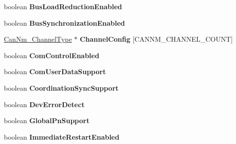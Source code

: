 \begin{DoxyCompactItemize}
\item 
boolean {\bfseries Bus\+Load\+Reduction\+Enabled}\hypertarget{structCanNm__ConfigType_aa6b95e5042692945b91580bbb8b4dfd3}{}\label{structCanNm__ConfigType_aa6b95e5042692945b91580bbb8b4dfd3}

\item 
boolean {\bfseries Bus\+Synchronization\+Enabled}\hypertarget{structCanNm__ConfigType_adad31250fae945f7b5fd5e4e1b13e11d}{}\label{structCanNm__ConfigType_adad31250fae945f7b5fd5e4e1b13e11d}

\item 
\hyperlink{structCanNm__ChannelType}{Can\+Nm\+\_\+\+Channel\+Type} $\ast$ {\bfseries Channel\+Config} \mbox{[}C\+A\+N\+N\+M\+\_\+\+C\+H\+A\+N\+N\+E\+L\+\_\+\+C\+O\+U\+NT\mbox{]}\hypertarget{structCanNm__ConfigType_a8c835a645a6e78766bca6702d6a55105}{}\label{structCanNm__ConfigType_a8c835a645a6e78766bca6702d6a55105}

\item 
boolean {\bfseries Com\+Control\+Enabled}\hypertarget{structCanNm__ConfigType_ae3126d62d493df7577c2ff4d01a140c8}{}\label{structCanNm__ConfigType_ae3126d62d493df7577c2ff4d01a140c8}

\item 
boolean {\bfseries Com\+User\+Data\+Support}\hypertarget{structCanNm__ConfigType_a8332e4e0309c89e65f8f5a45e7a9301c}{}\label{structCanNm__ConfigType_a8332e4e0309c89e65f8f5a45e7a9301c}

\item 
boolean {\bfseries Coordination\+Sync\+Support}\hypertarget{structCanNm__ConfigType_aec019c38598d98a49feed2e1b3e55d6c}{}\label{structCanNm__ConfigType_aec019c38598d98a49feed2e1b3e55d6c}

\item 
boolean {\bfseries Dev\+Error\+Detect}\hypertarget{structCanNm__ConfigType_a639c20f409639819ec87dd885099e612}{}\label{structCanNm__ConfigType_a639c20f409639819ec87dd885099e612}

\item 
boolean {\bfseries Global\+Pn\+Support}\hypertarget{structCanNm__ConfigType_a0e6f091db05fe8a81bc482136f9e9325}{}\label{structCanNm__ConfigType_a0e6f091db05fe8a81bc482136f9e9325}

\item 
boolean {\bfseries Immediate\+Restart\+Enabled}\hypertarget{structCanNm__ConfigType_a2cecc70eabc438894bc5903d5871e386}{}\label{structCanNm__ConfigType_a2cecc70eabc438894bc5903d5871e386}


\end{DoxyCompactItemize}
